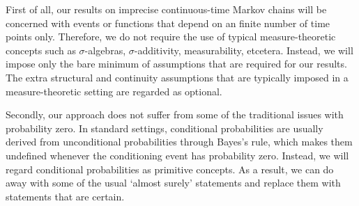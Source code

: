\documentclass[10pt,a4paper]{paper}
\theoremstyle{definition}
\newcommand{\reals}{\mathbb{R}}
\newcommand{\realsnonneg}{\reals_{\geq 0}}
\newcommand{\states}{\mathcal{X}}
\begin{document}

First of all, our results on imprecise continuous-time Markov chains will be concerned with events or functions that depend on an finite number of time points only. Therefore, we do not require the use of typical measure-theoretic concepts such as $\sigma$-algebras, $\sigma$-additivity, measurability, etcetera. Instead, we will impose only the bare minimum of assumptions that are required for our results. The extra structural and continuity assumptions that are typically imposed in a measure-theoretic setting are regarded as optional.%



Secondly, our approach does not suffer from some of the traditional issues with probability zero. In standard settings, conditional probabilities are usually derived from unconditional probabilities through Bayes's rule, which makes them undefined whenever the conditioning event has probability zero. Instead, we will regard conditional probabilities as primitive concepts. As a result, we can do away with some of the usual `almost surely' statements and replace them with statements that are certain.
\end{document}
